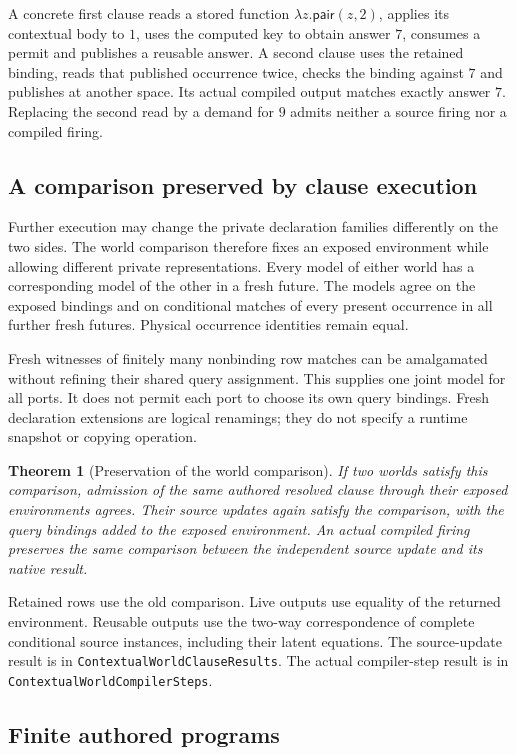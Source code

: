 \documentclass[11pt]{article}
\newtheorem{theorem}{Theorem}
\newcommand{\code}[1]{\texttt{\small #1}}
\begin{document}
A concrete first clause reads a stored function
$\lambda z.\mathsf{pair}(z,2)$, applies its contextual body to $1$,
uses the computed key to obtain answer $7$, consumes a permit and
publishes a reusable answer. A second clause uses the retained binding,
reads that published occurrence twice, checks the binding against $7$
and publishes at another space. Its actual compiled output matches
exactly answer $7$. Replacing the second read by a demand for $9$
admits neither a source firing nor a compiled firing.

\subsection{A comparison preserved by clause execution}

Further execution may change the private declaration families differently
on the two sides. The world comparison therefore fixes an exposed
environment while allowing different private representations. Every model
of either world has a corresponding model of the other in a fresh future.
The models agree on the exposed bindings and on conditional matches of
every present occurrence in all further fresh futures. Physical occurrence
identities remain equal.

Fresh witnesses of finitely many nonbinding row matches can be amalgamated
without refining their shared query assignment. This supplies one joint
model for all ports. It does not permit each port to choose its own query
bindings. Fresh declaration extensions are logical renamings; they do not
specify a runtime snapshot or copying operation.

\begin{theorem}[Preservation of the world comparison]
If two worlds satisfy this comparison, admission of the same authored
resolved clause through their exposed environments agrees. Their source
updates again satisfy the comparison, with the query bindings added to
the exposed environment. An actual compiled firing preserves the same
comparison between the independent source update and its native result.
\end{theorem}
Retained rows use the old comparison. Live outputs use equality of the
returned environment. Reusable outputs use the two-way correspondence
of complete conditional source instances, including their latent equations.
The source-update result is in \code{ContextualWorldClauseResults}.
The actual compiler-step result is in \code{ContextualWorldCompilerSteps}.

\subsection{Finite authored programs}
\end{document}
